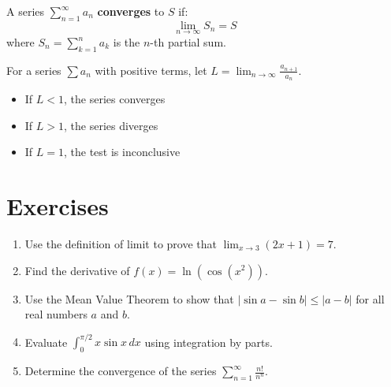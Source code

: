 \begin{definition}[Convergence]
A series $\sum_{n=1}^{\infty} a_n$ \textbf{converges} to $S$ if:
\[\lim_{n \to \infty} S_n = S\]
where $S_n = \sum_{k=1}^{n} a_k$ is the $n$-th partial sum.
\end{definition}

\begin{theorem}
For a series $\sum a_n$ with positive terms, let $L = \lim_{n \to \infty} \frac{a_{n+1}}{a_n}$.
\begin{itemize}
    \item If $L < 1$, the series converges
    \item If $L > 1$, the series diverges
    \item If $L = 1$, the test is inconclusive
\end{itemize}
\end{theorem}

\section{Exercises}

\begin{enumerate}
    \item Use the definition of limit to prove that $\lim_{x \to 3} (2x + 1) = 7$.
    
    \item Find the derivative of $f(x) = \ln(\cos(x^2))$.
    
    \item Use the Mean Value Theorem to show that $|\sin a - \sin b| \leq |a - b|$ for all real numbers $a$ and $b$.
    
    \item Evaluate $\int_0^{\pi/2} x \sin x \, dx$ using integration by parts.
    
    \item Determine the convergence of the series $\sum_{n=1}^{\infty} \frac{n!}{n^n}$.
\end{enumerate}
